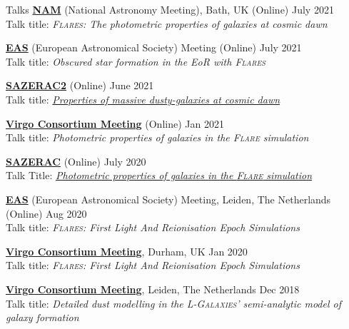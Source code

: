 \documentclass[a4paper,10pt]{resume} %
\begin{document}
\begin{rSection}{Talks}
	{\textbf{\href{https://nam2021.org/}{NAM}} (National Astronomy Meeting), Bath, UK (Online)} \hfill {July 2021}
	\\
	Talk title: \textit{\textsc{Flares}: The photometric properties of galaxies at cosmic dawn}
	
	{\textbf{\href{https://eas.unige.ch//EAS2021/about.jsp}{EAS}} (European Astronomical Society) Meeting (Online)} \hfill {July 2021}
	\\
	Talk title: \textit{Obscured star formation in the EoR with \textsc{Flares}}
	
	{\textbf{\href{http://sazerac-conference.org/2021/}{SAZERAC2}} (Online)} \hfill {June 2021}
	\\
	Talk title: \textit{\href{https://youtu.be/ncObY0lRN5w?list=PLp95u5tgS_YVAYXzVipf1ANzWUASqCc4Q}{\color{blue}\textit{Properties of massive dusty-galaxies at cosmic dawn}}}
	
	{\textbf{\href{http://www.virgo.dur.ac.uk/}{\textrm{Virgo Consortium Meeting}}} (Online)} \hfill {Jan 2021}
	\\
	Talk title: \textit{Photometric properties of galaxies in the \textsc{Flare} simulation}
	
	{\textbf{\href{http://sazerac-conference.org/2020/}{SAZERAC}} (Online)} \hfill {July 2020}
	\\
	Talk Title: \href{https://www.youtube.com/watch?v=S5FeQ6SUqK8}{\color{blue}\textit{Photometric properties of galaxies in the \textsc{Flare} simulation}}
	
	{\textbf{\href{https://eas.unige.ch/EAS2020/}{EAS}} (European Astronomical Society) Meeting, Leiden, The Netherlands (Online)} \hfill {Aug 2020}
	\\
	{Talk title: \textit{\textsc{Flares}: First Light And Reionisation Epoch Simulations}}
	
	{\textbf{\href{http://www.virgo.dur.ac.uk/}{Virgo Consortium Meeting}}, Durham, UK} \hfill {Jan 2020}
	\\
	{Talk title: \textit{\textsc{Flares}: First Light And Reionisation Epoch Simulations}}
	
	{\textbf{\href{http://www.virgo.dur.ac.uk/}{\textrm{Virgo Consortium Meeting}}}, Leiden, The Netherlands} \hfill {Dec 2018}
	\\
	{Talk title: \textit{Detailed dust modelling in the \textsc{L-Galaxies}’ semi-analytic model of galaxy formation}}
\end{rSection}

\end{document}
